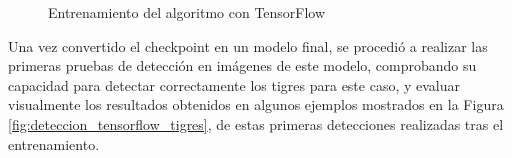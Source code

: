  \begin{figure}[H]
    \begin{center}
      \subcapcentertrue
      \hspace{4mm}
    \end{center}
    \caption{Entrenamiento del algoritmo con TensorFlow}
    \label{fig:Deteccion_Prueba_TF}
  \end{figure}
  
Una vez convertido el checkpoint en un modelo final, se procedió a realizar las primeras pruebas de detección en imágenes de este modelo, comprobando su capacidad para detectar correctamente los tigres para este caso, y evaluar visualmente los resultados obtenidos en algunos ejemplos mostrados en la Figura \ref{fig:deteccion_tensorflow_tigres}, de estas primeras detecciones realizadas tras el entrenamiento.

